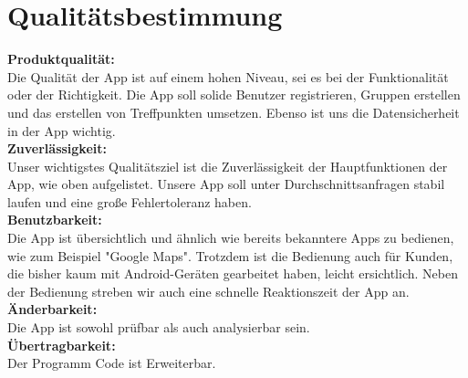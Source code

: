 \section{Qualitätsbestimmung}
\textbf{Produktqualität:}\\ %
Die Qualität der App ist auf einem hohen Niveau, sei es bei der Funktionalität oder der Richtigkeit. Die App soll solide Benutzer registrieren, Gruppen erstellen und das erstellen von Treffpunkten umsetzen. Ebenso ist uns die Datensicherheit in der App wichtig.\\
\textbf{Zuverlässigkeit:}\\%
Unser wichtigstes Qualitätsziel ist die Zuverlässigkeit der Hauptfunktionen der App, wie oben aufgelistet. Unsere App soll unter Durchschnittsanfragen stabil laufen und eine große Fehlertoleranz haben. \\
\textbf{Benutzbarkeit:}\\ %
Die App ist übersichtlich und ähnlich wie bereits bekanntere Apps zu bedienen, wie zum Beispiel "Google Maps". Trotzdem ist die Bedienung auch für Kunden, die bisher kaum mit Android-Geräten gearbeitet haben, leicht ersichtlich. Neben der Bedienung streben wir auch eine schnelle Reaktionszeit der App an.\\
\textbf{Änderbarkeit:}\\ %
Die App ist sowohl prüfbar als auch analysierbar sein. \\
\textbf{Übertragbarkeit:}\\%
Der Programm Code ist Erweiterbar.\\